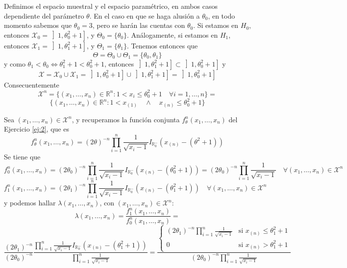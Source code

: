 \documentclass[12pt]{article}
\newcommand{\R}{\mathbb{R}}
\newcommand{\X}{\mathcal{X}}
\begin{document}
\begin{ejercicio}
        Definimos el espacio muestral y el espacio paramétrico, en ambos casos dependiente del parámetro
        $\theta$. En el caso en que se haga alusión a $\theta_0$, en todo momento sabemos que $\theta_0 = 3$, pero se harán las cuentas con $\theta_0$. 
        Si estamos en $H_0$, entonces $\X_0 = \left]1, \theta_0^2 + 1 \right]$, y $\Theta_0 = 
        \{\theta_0\}$. Análogamente, si estamos en $H_1$, entonces $\X_1 = \left]1, \theta_1^2 + 1 \right]$, y $\Theta_1 = 
        \{\theta_1\}$. Tenemos entonces que $$\Theta = \Theta_0 \cup \Theta_1 = \{\theta_0, \theta_1\}$$ y como
        $\theta_1 < \theta_0 \iff \theta_1^2 + 1 < \theta_0^2 + 1$, entonces $\left]1, \theta_1^2 + 1 \right] \subset \left]1, \theta_0^2 + 1 \right]$ y
        $$\X = \X_0 \cup \X_1 = \left]1, \theta_0^2 + 1 \right] \cup \left]1, \theta_1^2 + 1 \right] = \left]1, \theta_0^2 + 1 \right]$$
        Consecuentemente $$\X^n = \{(x_1, \ldots, x_n) \in \R^n : 1 < x_i \leq \theta_0^2 + 1 \quad \forall i = 1, \ldots, n\} = $$
        $$\{(x_1, \ldots, x_n) \in \R^n : 1 < x_{(1)} \quad \land \quad x_{(n)} \leq \theta_0^2 + 1\}$$

        Sea $(x_1, \ldots, x_n) \in \X^n$, y recuperamos la función conjunta $f_\theta^n(x_1, \ldots, x_n)$ del Ejercicio \ref{ej:2}, que es 
        $$f^n_\theta(x_1, \ldots, x_n) = (2\theta)^{-n} \prod_{i=1}^{n} \frac{1}{\sqrt{x_i-1}} I_{\R_0^{-}}(x_{(n)} - (\theta^2+1))$$ 
        Se tiene que
        $$f_0^n(x_1, \ldots, x_n) = (2\theta_0)^{-n} \prod_{i=1}^{n} \frac{1}{\sqrt{x_i-1}} I_{\R_0^{-}}(x_{(n)} - (\theta_0^2+1)) = (2\theta_0)^{-n} \prod_{i=1}^{n} \frac{1}{\sqrt{x_i-1}} \quad \forall (x_1, \ldots, x_n) \in \X^n$$
        $$f_1^n(x_1, \ldots, x_n) = (2\theta_1)^{-n} \prod_{i=1}^{n} \frac{1}{\sqrt{x_i-1}} I_{\R_0^{-}}(x_{(n)} - (\theta_1^2+1)) \quad \forall (x_1, \ldots, x_n) \in \X^n$$
        y podemos hallar $\lambda(x_1, \ldots, x_n)$, con $(x_1, \ldots, x_n) \in \X^n$: 
        $$\lambda(x_1, \ldots, x_n) = \dfrac{f_1^n(x_1, \ldots, x_n)}{f_0^n(x_1, \ldots, x_n)} = $$$$
        \dfrac{(2\theta_1)^{-n}}{(2\theta_0)^{-n}} \dfrac{\displaystyle\prod_{i=1}^{n} \frac{1}{\sqrt{x_i-1}} I_{\R_0^{-}}(x_{(n)} - (\theta_1^2+1))}
        {\displaystyle \prod_{i=1}^{n} \frac{1}{\sqrt{x_i-1}}} = 
        \dfrac{\begin{cases} (2\theta_1)^{-n} \displaystyle\prod_{i=1}^{n} \frac{1}{\sqrt{x_i-1}} &\text{si } x_{(n)} \leq \theta_1^2 + 1 \\ 0 &\text{si } x_{(n)} > \theta_1^2 + 1 \end{cases}}
        {(2\theta_0)^{-n} \displaystyle\prod_{i=1}^{n} \frac{1}{\sqrt{x_i-1}}}$$


\end{ejercicio}
\end{document}
